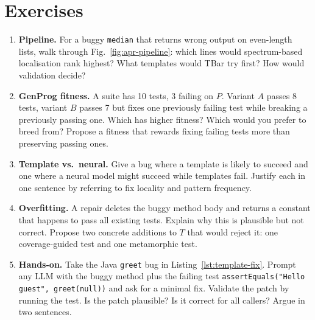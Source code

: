 \section{Exercises}
\label{sec:ch04-exercises}
\begin{enumerate}[label=E4.\arabic*, leftmargin=*, itemsep=0.7em]
    \item \textbf{Pipeline.} For a buggy \texttt{median} that returns wrong output on even-length lists, walk through Fig.~\ref{fig:apr-pipeline}: which lines would spectrum-based localisation rank highest? What templates would TBar try first? How would validation decide?
    \item \textbf{GenProg fitness.} A suite has 10 tests, 3 failing on $P$. Variant $A$ passes 8 tests, variant $B$ passes 7 but fixes one previously failing test while breaking a previously passing one. Which has higher fitness? Which would you prefer to breed from? Propose a fitness that rewards fixing failing tests more than preserving passing ones.
    \item \textbf{Template vs.\ neural.} Give a bug where a template is likely to succeed and one where a neural model might succeed while templates fail. Justify each in one sentence by referring to fix locality and pattern frequency.
    \item \textbf{Overfitting.} A repair deletes the buggy method body and returns a constant that happens to pass all existing tests. Explain why this is plausible but not correct. Propose two concrete additions to $T$ that would reject it: one coverage-guided test and one metamorphic test.
    \item \textbf{Hands-on.} Take the Java \texttt{greet} bug in Listing~\ref{lst:template-fix}. Prompt any LLM with the buggy method plus the failing test \texttt{assertEquals("Hello guest", greet(null))} and ask for a minimal fix. Validate the patch by running the test. Is the patch plausible? Is it correct for all callers? Argue in two sentences.
\end{enumerate}
